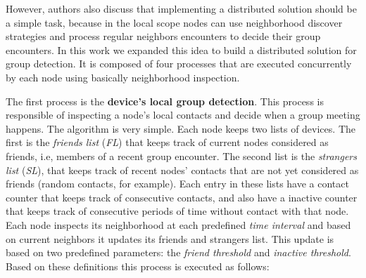However, authors also discuss that implementing a distributed solution should be a simple task, because in the local scope nodes can use neighborhood discover strategies and process regular neighbors encounters to decide their group encounters. In this work we expanded this idea to build a distributed solution for group detection. It is composed of four processes that are executed concurrently by each node using basically neighborhood inspection.

The first process is the \textbf{device's local group detection}. This process is responsible of inspecting a node's local contacts and decide when a group meeting happens. The algorithm is very simple. Each node keeps two lists of devices. The first is the \textit{friends list} (\textit{FL}) that keeps track of current nodes considered as friends, i.e, members of a recent group encounter. The second list is the \textit{strangers list} (\textit{SL}), that keeps track of recent nodes' contacts that are not yet considered as friends (random contacts, for example). Each entry in these lists have a contact counter that keeps track of consecutive contacts, and also have a inactive counter that keeps track of consecutive periods of time without contact with that node. Each node inspects its neighborhood at each predefined \textit{time interval} and based on current neighbors it updates its friends and strangers list. This update is based on two predefined parameters: the \textit{friend threshold} and \textit{inactive threshold}. Based on these definitions this process is executed as follows:

